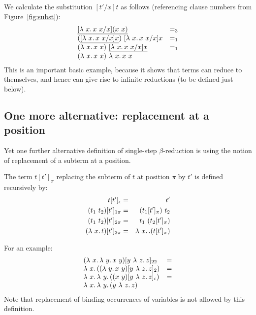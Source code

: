 \begin{enumerate}
    We calculate the substitution $[t'/x]t$ as follows (referencing clause numbers from Figure~\ref{fig:subst}):
    \[
    \begin{array}{ll}
      \underline{[\lam{x}{x\ x} / x](x\ x)} & =_3 \\
      (\underline{[\lam{x}{x\ x} / x]x})\ [\lam{x}{x\ x} / x]x & =_1 \\
      (\lam{x}{x\ x})\ \underline{[\lam{x}{x\ x} / x]x} & =_1 \\
      (\lam{x}{x\ x})\ \lam{x}{x\ x} & \ 
    \end{array}
    \]
    \noindent This is an important basic example, because it shows
    that terms can reduce to themselves, and hence can give rise to
    infinite reductions (to be defined just below).
    \end{enumerate}

\subsection{One more alternative: replacement at a position}

Yet one further alternative definition of single-step $\beta$-reduction
is using the notion of replacement of a subterm at a position.

\begin{definition}
  The term $t[t']_\pi$ replacing the subterm of $t$ at position $\pi$ by $t'$ is defined recursively by:
  \begin{eqnarray*}
    t[t']_\epsilon & = & t' \\
    (t_1\ t_2)[t']_{1\pi} & = & (t_1[t']_\pi)\ t_2 \\
    (t_1\ t_2)[t']_{2\pi} & = & t_1\ (t_2[t']_\pi) \\    
    (\lambda\ x.\, t)[t']_{2\pi} & = & \lambda\ x.\, .(t[t']_\pi)
  \end{eqnarray*}
\end{definition}

\noindent For an example:
\[
\begin{array}{ll}
  (\lambda\ x.\, \lambda\ y.\, x\ y)[y\ \lambda\ z.\, z]_{22} & = \\
  \lambda\ x.\, ((\lambda\ y.\, x\ y)[y\ \lambda\ z.\, z]_{2}) & = \\
  \lambda\ x.\, \lambda\ y.\, ((x\ y)[y\ \lambda\ z.\, z]_{\epsilon}) & = \\
  \lambda\ x.\, \lambda\ y.\, (y\ \lambda\ z.\, z)
\end{array}
\]
Note that replacement of binding occurrences of variables is not allowed by this definition.

